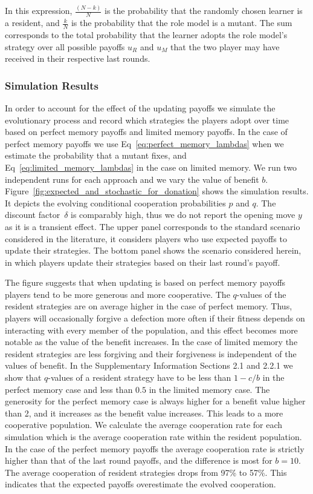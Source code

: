 \documentclass[11pt]{article}
\theoremstyle{plainCl1}
\theoremstyle{plainCl2}
\begin{document}
In this expression, $\frac{(N\!-\!k)}{N}$ is the probability that the randomly
chosen learner is a resident, and $\frac{k}{N}$ is the probability that the role
model is a mutant. The sum corresponds to the total probability that the learner
adopts the role model's strategy over all possible payoffs $u_R$ and $u_M$ that
the two player may have received in their respective last rounds.

\subsubsection*{Simulation Results}

In order to account for the effect of the updating payoffs we simulate the
evolutionary process and record which strategies the players adopt over time
based on perfect memory payoffs and limited memory payoffs. In the case of
perfect memory payoffs we use Eq~\ref{eq:perfect_memory_lambdas} when we
estimate the probability that a mutant fixes, and
Eq~\ref{eq:limited_memory_lambdas} in the case on limited memory. We run two
independent runs for each approach and we vary the value of benefit \(b\).
Figure~\ref{fig:expected_and_stochastic_for_donation} shows the simulation
results. It depicts the evolving conditional cooperation probabilities $p$ and
$q$. The discount factor~$\delta$ is comparably high, thus we do not report the
opening move \(y\) as it is a transient effect. The upper panel corresponds to
the standard scenario considered in the literature, it considers players who use
expected payoffs to update their strategies. The bottom panel shows the scenario
considered herein, in which players update their strategies based on their last
round's payoff.

The figure suggests that when updating is based on perfect memory payoffs
players tend to be more generous and more cooperative. The $q$-values of the
resident strategies are on average higher in the case of perfect memory. Thus,
players will occasionally forgive a defection more often if their fitness
depends on interacting with every member of the population, and this effect
becomes more notable as the value of the benefit increases. In the case of
limited memory the resident strategies are less forgiving and their forgiveness
is independent of the values of benefit. In the Supplementary Information
Sections 2.1 and 2.2.1 we show that $q$-values of a resident strategy have to be less
than \(1 - c/b\) in the perfect memory case and less than \(0.5\) in the limited
memory case. The generosity for the perfect memory case is always higher for a
benefit value higher than 2, and it increases as the benefit value increases.
This leads to a more cooperative population. We calculate the average
cooperation rate for each simulation which is the average cooperation rate
within the resident population. In the case of the perfect memory payoffs the
average cooperation rate is strictly higher than that of the last round payoffs,
and the difference is most for $b=10$. The average cooperation of resident
strategies drops from 97\% to 57\%. This indicates that the expected payoffs
overestimate the evolved cooperation.
\end{document}
